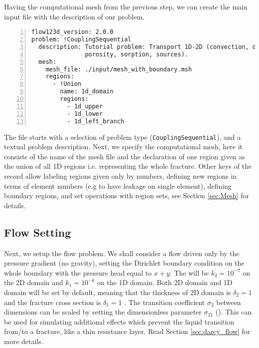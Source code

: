 Having the computational mesh from the previous step, we can create the main input file with the description of our problem. 
\begin{Verbatim}[numbers=left]
flow123d_version: 2.0.0
problem: !CouplingSequential
  description: Tutorial problem: Transport 1D-2D (convection, dual
               porosity, sorption, sources).
  mesh:
    mesh_file: ./input/mesh_with_boundary.msh
    regions:
      - !Union
        name: 1d_domain
        regions:
          - 1d_upper
          - 1d_lower
          - 1d_left_branch
\end{Verbatim}
The file starts with a selection of problem type (\verb'CouplingSequential'), and a textual problem description.
Next, we specify the computational mesh, here it consists of the name of the mesh file and the declaration of one region 
given as the union of all 1D regions i.e. representing the whole fracture. Other keys of the  record allow labeling regions given only by numbers, 
defining new regions in terms of element numbers (e.g to have leakage on single element), 
defining boundary regions, and set operations with region sets, see Section \ref{sec:Mesh} for details.

\subsection{Flow Setting}
Next, we setup the flow problem. We shall consider a flow driven only by the pressure gradient (no gravity),
setting the Dirichlet boundary condition on the whole boundary with the pressure head equal to $x+y$. 
The  will be $k_2=10^{-7}$  on the 2D domain and $k_1=10^{-6}$  on the 1D domain.
Both 2D domain and 1D domain  will be set by default,
meaning that the thickness of 2D domain is $\delta_2=1$  and the fracture cross section is $\delta_1=1$ .
The transition coefficient $\sigma_2$ between dimensions can be scaled by setting the dimensionless parameter 
$\sigma_{21}$ (). This can be used for simulating additional
effects which prevent the liquid transition from/to a fracture, like a thin resistance layer. Read Section 
\ref{sec:darcy_flow} for more details.


